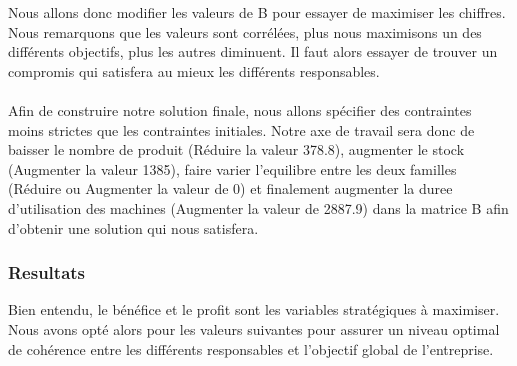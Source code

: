 \documentclass[a4paper, 11pt]{article}
\begin{document}
Nous allons donc modifier les valeurs de B pour essayer de maximiser les chiffres.
Nous remarquons que les valeurs sont corrélées, plus nous maximisons un des différents objectifs, plus les autres diminuent. Il faut alors essayer de trouver un compromis qui satisfera au mieux les différents responsables.\\\\

Afin de construire notre solution finale, nous allons spécifier des contraintes moins strictes que les contraintes initiales. Notre axe de travail sera donc de baisser le nombre de produit (Réduire la valeur 378.8), augmenter le stock (Augmenter la valeur 1385), faire varier l'equilibre entre les deux familles (Réduire ou Augmenter la valeur de 0) et finalement augmenter la duree d'utilisation des machines (Augmenter la valeur de 2887.9) dans la matrice B afin d'obtenir une solution qui nous satisfera. 
\subsubsection{Resultats}
Bien entendu, le bénéfice et le profit sont les variables stratégiques à maximiser.  
Nous avons opté alors pour les valeurs suivantes pour assurer un niveau optimal de cohérence entre les différents responsables et l'objectif global de l'entreprise. 
\end{document}
